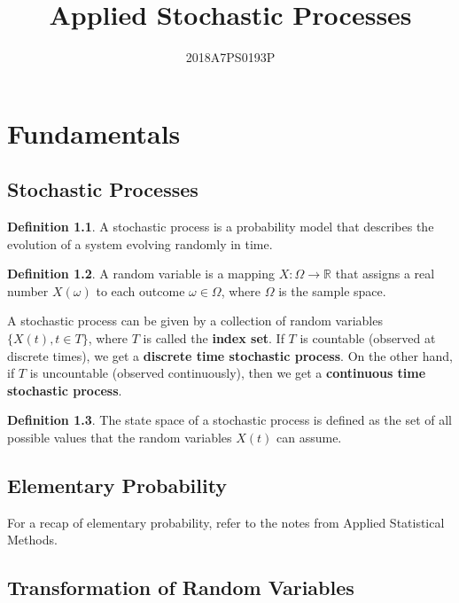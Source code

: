 \documentclass[12pt,letterpaper]{amsbook}
\title{Applied Stochastic Processes}
\author{2018A7PS0193P}
\theoremstyle{definition}
\newtheorem{definition}{Definition}%
\newcommand{\R}{\mathbb{R}}
\begin{document}
\maketitle

\chapter{Fundamentals}

\section{Stochastic Processes}

\begin{definition}
  A stochastic process is a probability model that describes the evolution of a system evolving randomly in time.
\end{definition}

\begin{definition}
  A random variable is a mapping $X : \Omega \rightarrow \R$ that assigns a real number $X(\omega)$ to each outcome $\omega \in \Omega$, where $\Omega$ is the sample space.
\end{definition}

A stochastic process can be given by a collection of random variables $\{X(t), t \in T\}$, where $T$ is called the \textbf{index set}. If $T$ is countable (observed at discrete times), we get a \textbf{discrete time stochastic process}. On the other hand, if $T$ is uncountable (observed continuously), then we get a \textbf{continuous time stochastic process}.

\begin{definition}
  The state space  of a stochastic process is defined as the set of all possible values that the random variables $X(t)$ can assume.
\end{definition}

\section{Elementary Probability}

For a recap of elementary probability, refer to the notes from Applied Statistical Methods.

\section{Transformation of Random Variables}

\phantom{Invisible text to fix mdframe, I don't want to switch to tcolorbox}
\end{document}
